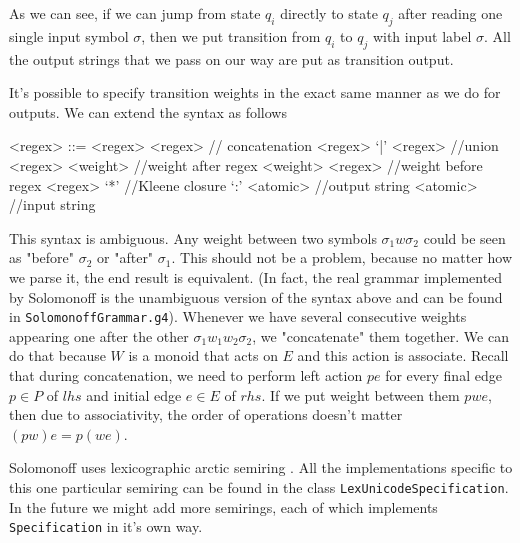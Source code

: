 \documentclass[12pt]{article}
\begin{document}
As we can see, if we can jump from state $q_i$ directly to state $q_j$ after reading one single input symbol $\sigma$, then we put transition from $q_i$ to $q_j$ with input label $\sigma$. All the output strings that we pass on our way are put as transition output.

It's possible to specify transition weights in the exact same manner as we do for outputs. We can extend the syntax as follows

\begin{grammar}
	
	<regex> ::= <regex> <regex> // concatenation
	\alt <regex> `|' <regex> //union
	\alt <regex> <weight> //weight after regex
	\alt  <weight> <regex> //weight before regex
	\alt <regex> `*'              //Kleene closure
	\alt `:' <atomic> //output string
	\alt <atomic> //input string
	
\end{grammar}

This syntax is ambiguous. Any weight between two symbols $\sigma_1 w \sigma_2$ could be seen as "before" $\sigma_2$ or "after" $\sigma_1$. This should not be a problem, because no matter how we parse it, the end result is equivalent. (In fact, the real grammar implemented by Solomonoff is the unambiguous version of the syntax above and can be found in \texttt{SolomonoffGrammar.g4}).
Whenever we have several consecutive weights appearing one after the other $\sigma_1 w_1 w_2 \sigma_2$, we  "concatenate" them together. We can do that because $W$ is a monoid that acts on $E$ and this action is associate. Recall that during concatenation, we need to perform left action $pe$ for every final edge $p\in P$ of $lhs$ and initial edge $e\in E$ of $rhs$. If we put weight between them $pwe$, then due to associativity, the order of operations doesn't matter $(pw)e=p(we)$. 

Solomonoff uses lexicographic arctic semiring \cite{MendozaDrosik2020MultitapeAA}. All the implementations specific to this one particular semiring can be found in the class
\texttt{LexUnicodeSpecification}. In the future we might add more semirings, each of which implements \texttt{Specification} in it's own way.  
\end{document}
